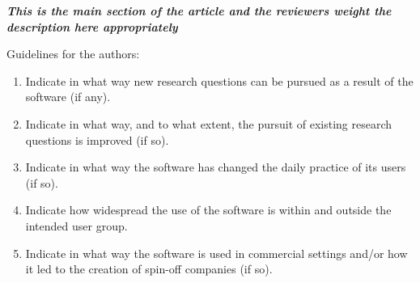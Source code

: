 \documentclass[preprint,12pt, a4paper]{elsarticle}
\begin{document}
{\em \textbf{This is the main section of the article and the reviewers weight
the description here appropriately}

Guidelines for the authors:
\begin{enumerate}
  \item Indicate in what way new research questions can be pursued as a
  result of the software (if any).
  \item Indicate in what way, and to what extent, the pursuit of existing
  research questions is improved (if so).
  \item Indicate in what way the software has changed the daily practice of
  its users (if so).
  \item Indicate how widespread the use of the software is within and outside
  the intended user group.
  \item Indicate in what way the software is used in commercial settings
  and/or how it led to the creation of spin-off companies (if so).
\end{enumerate}}
\end{document}
